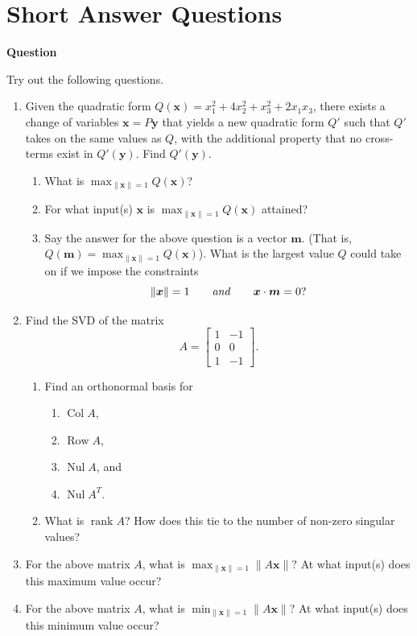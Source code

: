 \documentclass[10pt, titlepage]{article}
\newcounter{question}
\newenvironment{newquestion}
{
	\noindent\textbf{Question \thequestion}
}
{
\stepcounter{question}
\par
}
\renewcommand{\vec}[1]{\bm{#1}}
\DeclareMathOperator{\colspace}{Col}
\DeclareMathOperator{\rowspace}{Row}
\DeclareMathOperator{\nullspace}{Nul}
\DeclareMathOperator{\rank}{rank}
\begin{document}
\section{\centering Short Answer Questions}
	\begin{newquestion}
		Try out the following questions.
		\begin{enumerate}
			\item Given the quadratic form \(Q(\vec{x}) = x_1^2 + 4x_2^2 + x_3^2 + 2x_1x_3\), there exists a change of variables \(\vec{x} = P\vec{y}\)
				that yields a new quadratic form \(Q'\) such that \(Q'\) takes on the same values as \(Q\), with the additional property that no cross-terms
				exist in \(Q'(\vec{y})\). Find \(Q'(\vec{y})\).
				\begin{enumerate}
					\item What is \(\max_{\|\vec{x}\|  = 1} Q(\vec{x})\)?
					\item For what input(s) \(\vec{x}\) is \(\max_{\|\vec{x}\| = 1} Q(\vec{x})\) attained?
					\item Say the answer for the above question is a vector \(\vec{m}\). (That is, \(Q(\vec{m}) = \max_{\|\vec{x}\| = 1} Q(\vec{x})\)). What is the largest value \(Q\) could take on if we impose the 
						constraints \[\|\vec{x}\| = 1 \qquad \text{\emph{and}} \qquad \vec{x} \cdot \vec{m} = 0?\]
				\end{enumerate}
			 
			\item Find the SVD of the matrix \[A = \begin{bmatrix}1 & -1 \\ 0 & 0 \\ 1 & -1\end{bmatrix}.\]
				\begin{enumerate}
					\item Find an orthonormal basis for 
						\begin{enumerate}
							\item \(\colspace A\), 
							\item \(\rowspace A\), 
							\item \(\nullspace A\), and 
							\item \(\nullspace A^T\).
						\end{enumerate}
					\item What is \(\rank A\)? How does this tie to the number of non-zero singular values?
				\end{enumerate}
			\item For the above matrix \(A\), what is \(\max_{\|\vec{x}\| = 1} \|A\vec{x}\|\)? At what input(s) does this maximum value occur?
			\item For the above matrix \(A\), what is \(\min_{\|\vec{x}\| = 1} \|A\vec{x}\|\)? At what input(s) does this minimum value occur?
		\end{enumerate} 
	\end{newquestion}


\end{document}
